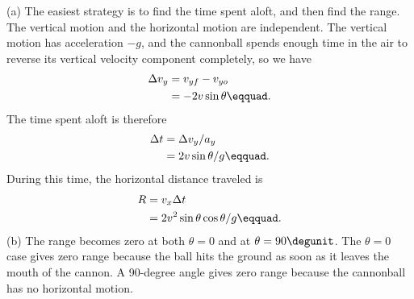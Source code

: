 (a) The easiest strategy is to find the time spent aloft,
and then find the range. The vertical motion and the
horizontal motion are independent. The vertical motion has
acceleration $-g$, and the cannonball spends enough time in
the air to reverse its vertical velocity component
completely, so we have
\begin{align*}
        \Delta v_y     &=  v_{yf}-v_{yo}  \\
             &=  -2v \sin  \theta\eqquad.
\end{align*}
The time spent aloft is therefore
\begin{align*}
        \Delta t     &=  \Delta v_y/ a_y  \\
             &=  2v \sin  \theta  / g\eqquad.
\end{align*}
During this time, the horizontal distance traveled is
\begin{align*}
        R     &=  v_x\Delta t  \\
             &=  2 v ^2 \sin  \theta \cos  \theta  / g\eqquad.
\end{align*}
(b) The range becomes zero at both $\theta=0$ and at
$\theta=90\degunit$. The $\theta=0$ case gives zero range
because the ball hits the ground as soon as it leaves the
mouth of the cannon. A 90-degree angle gives zero range
because the cannonball has no horizontal motion.
